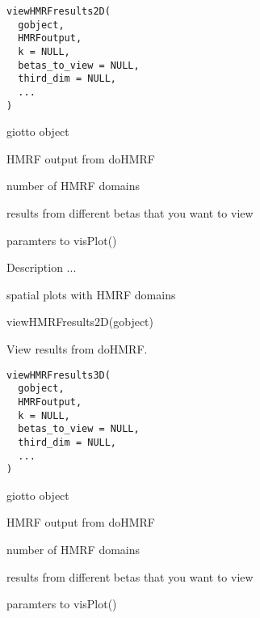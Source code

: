 \documentclass[a4paper]{book}
\begin{document}
%
\begin{Usage}
\begin{verbatim}
viewHMRFresults2D(
  gobject,
  HMRFoutput,
  k = NULL,
  betas_to_view = NULL,
  third_dim = NULL,
  ...
)
\end{verbatim}
\end{Usage}
%
\begin{Arguments}
\begin{ldescription}
\item[\code{gobject}] giotto object

\item[\code{HMRFoutput}] HMRF output from doHMRF

\item[\code{k}] number of HMRF domains

\item[\code{betas\_to\_view}] results from different betas that you want to view

\item[\code{...}] paramters to visPlot()
\end{ldescription}
\end{Arguments}
%
\begin{Details}\relax
Description ...
\end{Details}
%
\begin{Value}
spatial plots with HMRF domains
\end{Value}
%
\begin{SeeAlso}\relax
{}
\end{SeeAlso}
%
\begin{Examples}
\begin{ExampleCode}
    viewHMRFresults2D(gobject)
\end{ExampleCode}
\end{Examples}
%
\begin{Description}\relax
View results from doHMRF.
\end{Description}
%
\begin{Usage}
\begin{verbatim}
viewHMRFresults3D(
  gobject,
  HMRFoutput,
  k = NULL,
  betas_to_view = NULL,
  third_dim = NULL,
  ...
)
\end{verbatim}
\end{Usage}
%
\begin{Arguments}
\begin{ldescription}
\item[\code{gobject}] giotto object

\item[\code{HMRFoutput}] HMRF output from doHMRF

\item[\code{k}] number of HMRF domains

\item[\code{betas\_to\_view}] results from different betas that you want to view

\item[\code{...}] paramters to visPlot()
\end{ldescription}
\end{Arguments}
\end{document}
